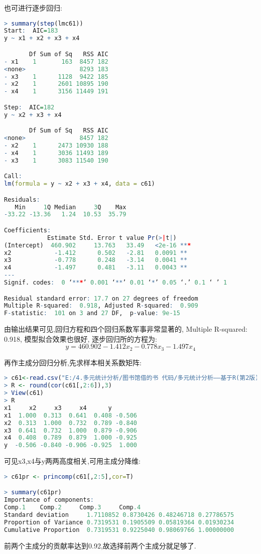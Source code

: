 \documentclass[11pt,a4paper,oneside]{book}
\begin{document}
也可进行逐步回归:
\begin{lstlisting}[language=r]
> summary(step(lmc61))
Start:  AIC=183
y ~ x1 + x2 + x3 + x4

       Df Sum of Sq   RSS AIC
- x1    1       163  8457 182
<none>               8293 183
- x3    1      1128  9422 185
- x2    1      2601 10895 190
- x4    1      3156 11449 191

Step:  AIC=182
y ~ x2 + x3 + x4

       Df Sum of Sq   RSS AIC
<none>               8457 182
- x2    1      2473 10930 188
- x4    1      3036 11493 189
- x3    1      3083 11540 190

Call:
lm(formula = y ~ x2 + x3 + x4, data = c61)

Residuals:
   Min     1Q Median     3Q    Max 
-33.22 -13.36   1.24  10.53  35.79 

Coefficients:
            Estimate Std. Error t value Pr(>|t|)    
(Intercept)  460.902     13.763   33.49   <2e-16 ***
x2            -1.412      0.502   -2.81   0.0091 ** 
x3            -0.778      0.248   -3.14   0.0041 ** 
x4            -1.497      0.481   -3.11   0.0043 ** 
---
Signif. codes:  0 ‘***’ 0.001 ‘**’ 0.01 ‘*’ 0.05 ‘.’ 0.1 ‘ ’ 1

Residual standard error: 17.7 on 27 degrees of freedom
Multiple R-squared:  0.918,	Adjusted R-squared:  0.909 
F-statistic:  101 on 3 and 27 DF,  p-value: 9e-15
\end{lstlisting}

由输出结果可见,回归方程和四个回归系数军事非常显著的, Multiple R-squared:  0.918, 模型拟合效果也很好, 逐步回归所的方程为: 
\[y=460.902-1.412x_2-0.778x_3-1.497x_4\]

再作主成分回归分析,先求样本相关系数矩阵:
\begin{lstlisting}[language=r]
> c61<-read.csv("E:/4.多元统计分析/图书馆借的书 代码/多元统计分析——基于R(第2版) R-data/case6.1.csv")
> R <- round(cor(c61[,2:6]),3)
> View(c61)
> R
x1     x2     x3     x4      y
x1  1.000  0.313  0.641  0.408 -0.506
x2  0.313  1.000  0.732  0.789 -0.840
x3  0.641  0.732  1.000  0.879 -0.906
x4  0.408  0.789  0.879  1.000 -0.925
y  -0.506 -0.840 -0.906 -0.925  1.000
\end{lstlisting}
可见x3,x4与y两两高度相关,可用主成分降维:
\begin{lstlisting}[language=r]
> c61pr <- princomp(c61[,2:5],cor=T)

> summary(c61pr)
Importance of components:
Comp.1    Comp.2     Comp.3     Comp.4
Standard deviation     1.7110852 0.8730426 0.48246718 0.27786575
Proportion of Variance 0.7319531 0.1905509 0.05819364 0.01930234
Cumulative Proportion  0.7319531 0.9225040 0.98069766 1.00000000
\end{lstlisting}
前两个主成分的贡献率达到0.92,故选择前两个主成分就足够了.
\end{document}
